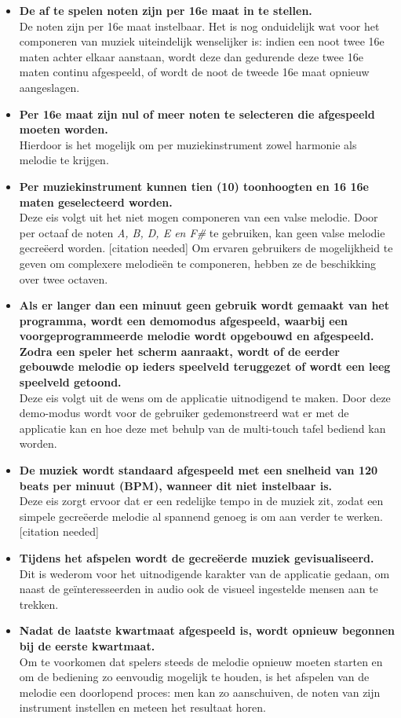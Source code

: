 \documentclass{acm}
\begin{document}
\begin{itemize}
	\item \textbf{De af te spelen noten zijn per 16e maat in te stellen.} \\ De noten zijn per 16e maat instelbaar. Het is nog onduidelijk wat voor het componeren van muziek uiteindelijk wenselijker is: indien een noot twee 16e maten achter elkaar aanstaan, wordt deze dan gedurende deze twee 16e maten continu afgespeeld, of wordt de noot de tweede 16e maat opnieuw aangeslagen.
	\item \textbf{Per 16e maat zijn nul of meer noten te selecteren die afgespeeld moeten worden.} \\ Hierdoor is het mogelijk om per muziekinstrument zowel harmonie als melodie te krijgen.
	\item \textbf{Per muziekinstrument kunnen tien (10) toonhoogten en 16 16e maten geselecteerd worden.} \\ Deze eis volgt uit het niet mogen componeren van een valse melodie. Door per octaaf de noten \textit{A, B, D, E en F\#} te gebruiken, kan geen valse melodie gecreëerd worden. [citation needed] Om ervaren gebruikers de mogelijkheid te geven om complexere melodie\"en te componeren, hebben ze de beschikking over twee octaven.
	\item \textbf{Als er langer dan een minuut geen gebruik wordt gemaakt van het programma, wordt een demomodus afgespeeld, waarbij een voorgeprogrammeerde melodie wordt opgebouwd en afgespeeld. Zodra een speler het scherm aanraakt, wordt of de eerder gebouwde melodie op ieders speelveld teruggezet of wordt een leeg speelveld getoond.} \\ Deze eis volgt uit de wens om de applicatie uitnodigend te maken. Door deze demo-modus wordt voor de gebruiker gedemonstreerd wat er met de applicatie kan en hoe deze met behulp van de multi-touch tafel bediend kan worden.
	\item \textbf{De muziek wordt standaard afgespeeld met een snelheid van 120 beats per minuut (BPM), wanneer dit niet instelbaar is.} \\ Deze eis zorgt ervoor dat er een redelijke tempo in de muziek zit, zodat een simpele gecre\"eerde melodie al spannend genoeg is om aan verder te werken. [citation needed]
	\item \textbf{Tijdens het afspelen wordt de gecreëerde muziek gevisualiseerd.} \\ Dit is wederom voor het uitnodigende karakter van de applicatie gedaan, om naast de ge\"interesseerden in audio ook de visueel ingestelde mensen aan te trekken.
	\item \textbf{Nadat de laatste kwartmaat afgespeeld is, wordt opnieuw begonnen bij de eerste kwartmaat.} \\ Om te voorkomen dat spelers steeds de melodie opnieuw moeten starten en om de bediening zo eenvoudig mogelijk te houden, is het afspelen van de melodie een doorlopend proces: men kan zo aanschuiven, de noten van zijn instrument instellen en meteen het resultaat horen.

\end{itemize}
\end{document}

